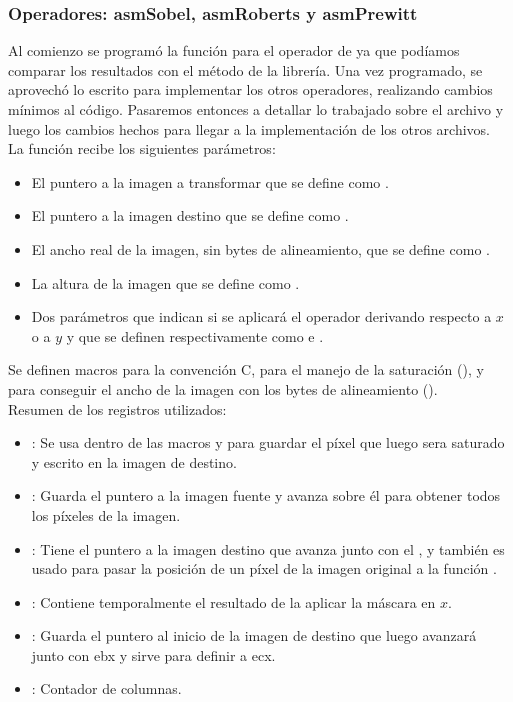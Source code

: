 \vspace{1cm}
\subsubsection{Operadores: asmSobel, asmRoberts y asmPrewitt}
Al comienzo se program\'o la funci\'on para el operador de  ya que pod\'iamos comparar los resultados con el 
m\'etodo  de la librer\'ia. Una vez programado, se aprovech\'o lo escrito para implementar los otros 
operadores, realizando cambios m\'inimos al c\'odigo. Pasaremos entonces a detallar lo trabajado sobre el archivo 
 y luego los cambios hechos para llegar a la implementaci\'on de los otros archivos.\\

La funci\'on recibe los siguientes par\'ametros:
\begin{itemize}
		\item El puntero a la imagen a transformar que se define como .
		\item El puntero a la imagen destino que se define como .
		\item El ancho real de la imagen, sin bytes de alineamiento, que se define como .
		\item La altura de la imagen que se define como .
		\item Dos par\'ametros que indican si se aplicar\'a el operador derivando respecto a $x$ o a $y$ y que se definen 
respectivamente como  e .
\end{itemize}

Se definen macros para la convenci\'on C, para el manejo de la saturaci\'on (), y para conseguir 
el ancho de la imagen con los bytes de alineamiento ().\\

\noindent Resumen de los registros utilizados:
\begin{itemize}
		\item {}: Se usa dentro de las macros y para guardar el p\'ixel que luego sera saturado y escrito 
en la imagen de destino.
		\item {}: Guarda el puntero a la imagen fuente y avanza sobre \'el para obtener todos los p\'ixeles 
de la imagen. 
		\item {}: Tiene el puntero a la imagen destino que avanza junto con el , y tambi\'en es usado 
para pasar la posici\'on de un p\'ixel de la imagen original a la funci\'on .
		\item {}: Contiene temporalmente el resultado de la aplicar la m\'ascara en $x$.
		\item {}: Guarda el puntero al inicio de la imagen de destino que luego avanzar\'a junto con ebx y sirve para definir a ecx.
		\item {}: Contador de columnas.
\end{itemize}

